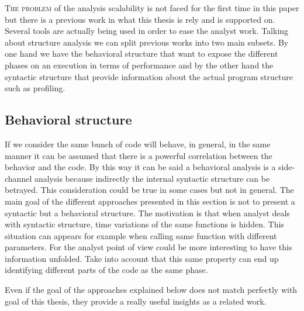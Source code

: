 \lettrine{T}{he problem} of the analysis scalability is not faced for the first time in 
this paper but there is a previous work in what this thesis is rely and is 
supported on. Several tools are actually being used in order to ease the analyst
work. Talking about structure analysis we can split previous works into two main
subsets. By one hand we have the behavioral structure that want to expose the
different phases on an execution in terms of performance and by the other hand
the syntactic structure that provide information about the actual program
structure such as profiling.

\subsection{Behavioral structure}

If we consider the same bunch of code will behave, in general, in the same
manner it can be assumed that there is a powerful correlation between the
behavior and the code. By this way it can be said a behavioral analysis is a
side-channel analysis because indirectly the internal syntactic structure can be
betrayed. This consideration could be true in some cases but not in general. The 
main goal of the different approaches presented in this section is not
to present a syntactic but a behavioral structure. The motivation is that when
analyst deals with syntactic structure, time variations of the same functions is
hidden. This situation can appears for example when calling same function with
different parameters. For the analyst point of view could be more interesting to
have this information unfolded. Take into account that this same property can
end up identifying different parts of the code as the same phase.

Even if the goal of the approaches explained below does not match perfectly with
goal of this thesis, they provide a really useful insights as a related work.

